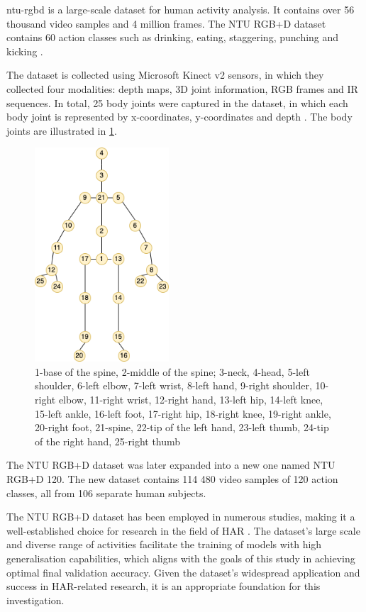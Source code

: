 \Gls{ntu-rgbd} is a large-scale dataset for human activity analysis. It contains over 56 thousand video samples and 4 million frames. The NTU RGB+D dataset contains 60 action classes such as drinking, eating, staggering, punching and kicking \autocite{Shahroudy_2016_CVPR}. 

The dataset is collected using Microsoft Kinect v2 sensors, in which they collected four modalities: depth maps, 3D joint information, RGB frames and IR sequences. In total, 25 body joints were captured in the dataset, in which each body joint is represented by x-coordinates, y-coordinates and depth \autocite{Shahroudy_2016_CVPR}. The body joints are illustrated in \cref{fig:ntu_body_joints}. 

\begin{figure}[!ht]
    \centering
    \includegraphics[width=5cm]{figures/nturgb.drawio.png}
    \caption{1-base of the spine, 2-middle of the spine; 3-neck, 4-head, 5-left shoulder, 6-left elbow, 7-left wrist, 8-left hand, 9-right shoulder, 10-right elbow, 11-right wrist, 12-right hand, 13-left hip, 14-left knee, 15-left ankle, 16-left foot, 17-right hip, 18-right knee, 19-right ankle, 20-right foot, 21-spine, 22-tip of the left hand, 23-left thumb, 24-tip of the right hand, 25-right thumb}
    \label{fig:ntu_body_joints}
\end{figure}

The NTU RGB+D dataset was later expanded into a new one named NTU RGB+D 120. The new dataset contains 114 480 video samples of 120 action classes, all from 106 separate human subjects. 

The NTU RGB+D dataset has been employed in numerous studies, making it a well-established choice for research in the field of \gls{HAR} \autocite{yan2018spatial, si2019attention, cheng2020skeleton}. The dataset's large scale and diverse range of activities facilitate the training of models with high generalisation capabilities, which aligns with the goals of this study in achieving optimal final validation accuracy. Given the dataset's widespread application and success in \gls{HAR}-related research, it is an appropriate foundation for this investigation.